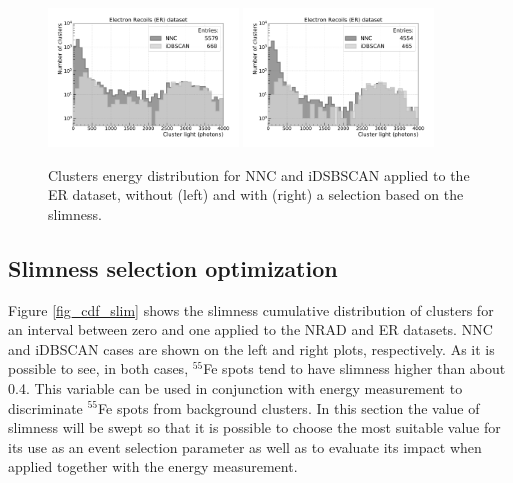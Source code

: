 \documentclass[a4paper,11pt]{article}
\begin{document}
\begin{figure}[ht]
\centering
\includegraphics[width=0.45\textwidth]{LigthYield_Fe_wo.pdf}
\includegraphics[width=0.45\textwidth]{LigthYield_Fe_Slim.pdf}
\caption{Clusters energy distribution for NNC and iDSBSCAN applied to the ER dataset, without (left) and with (right) a selection based on the slimness.}
\label{fig_compfe}
\end{figure}




\subsection{Slimness selection optimization}
Figure \ref{fig_cdf_slim} shows the slimness cumulative distribution of clusters for an interval between zero and one applied to the NRAD and ER datasets.
NNC and iDBSCAN cases are shown on the left and right plots, respectively.
As it is possible to see, in both cases, $^{55}$Fe spots tend to have slimness higher than about 0.4.
This variable can be used in conjunction with energy measurement to discriminate $^{55}$Fe spots from background clusters.
In this section the value of slimness will be swept so that it is possible to choose the most suitable value for its use as an event selection parameter as well as to evaluate its impact when applied together with the energy measurement.
\end{document}
